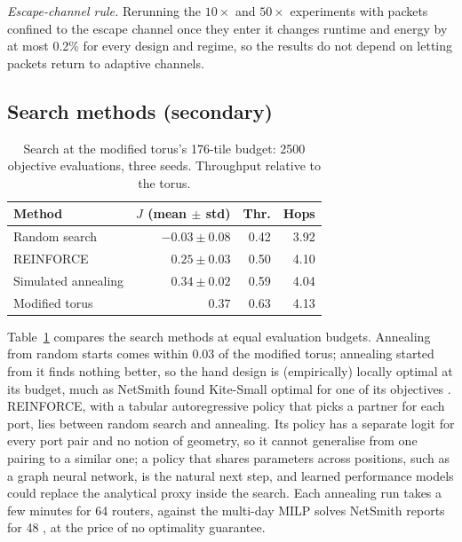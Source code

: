 \documentclass[preprint,12pt,a4paper]{elsarticle}
\begin{document}
\emph{Escape-channel rule.} Rerunning the $10\times$ and $50\times$
experiments with packets confined to the escape channel once they enter it
changes runtime and energy by at most 0.2\% for every design and regime, so
the results do not depend on letting packets return to adaptive channels.



\subsection{Search methods (secondary)}
\label{sec:res-search}

\begin{table}[t]
\centering
\caption{Search at the modified torus's 176-tile budget: 2500 objective
evaluations, three seeds. Throughput relative to the torus.}
\label{tab:search}
\small
\begin{tabular}{@{}lrrr@{}}
\toprule
Method & $J$ (mean $\pm$ std) & Thr. & Hops \\
\midrule
Random search        & $-0.03 \pm 0.08$ & 0.42 & 3.92 \\
REINFORCE            & $0.25 \pm 0.03$  & 0.50 & 4.10 \\
Simulated annealing  & $0.34 \pm 0.02$  & 0.59 & 4.04 \\
Modified torus       & $0.37$           & 0.63 & 4.13 \\
\bottomrule
\end{tabular}
\end{table}

Table~\ref{tab:search} compares the search methods at equal evaluation
budgets. Annealing from random starts comes within 0.03 of the modified
torus; annealing started from it finds nothing better, so the hand design
is (empirically) locally optimal at its budget, much as NetSmith found
Kite-Small optimal for one of its objectives \cite{netsmith}. REINFORCE,
with a tabular autoregressive policy that picks a partner for each port,
lies between random search and annealing. Its policy has a separate logit
for every port pair and no notion of geometry, so it cannot generalise from
one pairing to a similar one; a policy that shares parameters across
positions, such as a graph neural network, is the natural next step, and
learned performance models \cite{noception,noctopus} could replace the
analytical proxy inside the search. Each annealing run takes a few minutes
for 64 routers, against the multi-day MILP solves NetSmith reports for 48
\cite{netsmith}, at the price of no optimality guarantee.
\end{document}
